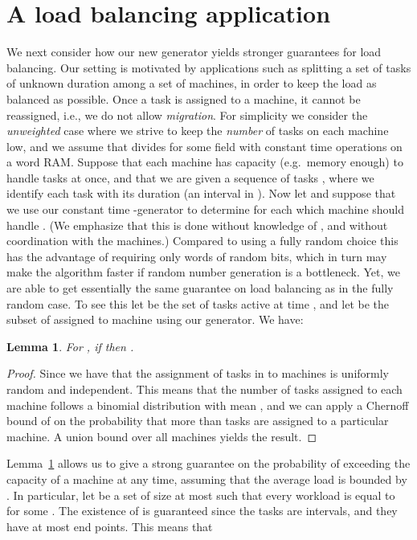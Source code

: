 \documentclass[a4paper,11pt]{article}
\theoremstyle{plain}
\newtheorem{lemma}{Lemma}
\theoremstyle{definition}
\begin{document}
\section{A load balancing application} \label{sec:loadbalancing}
We next consider how our new generator yields stronger guarantees for load balancing.
Our setting is motivated by applications such as splitting a set of tasks of unknown duration among a set of  machines, in order to keep the load as balanced as possible.
Once a task is assigned to a machine, it cannot be reassigned, i.e., we do not allow \emph{migration}.
For simplicity we consider the \emph{unweighted} case where we strive to keep the \emph{number} of tasks on each machine low, and we assume that  divides  for some field  with constant time operations on a word RAM.
Suppose that each machine has capacity (e.g.~memory enough) to handle  tasks at once, and that we are given a sequence of  tasks , where we identify each task with its duration (an interval in ).
Now let  and suppose that we use our constant time -generator to determine for each  which machine should handle .
(We emphasize that this is done without knowledge of , and without coordination with the machines.)
Compared to using a fully random choice this has the advantage of requiring only  words of random bits, which in turn may make the algorithm faster if random number generation is a bottleneck.
Yet, we are able to get essentially the same guarantee on load balancing as in the fully random case.
To see this let  be the set of tasks active at time , and let  be the subset of  assigned to machine  using our generator.
We have:
\begin{lemma}\label{lem:error}
For , if  then
.
\end{lemma}
\begin{proof}
Since  we have that the assignment of tasks in  to machines is uniformly random and independent.
This means that the number of tasks assigned to each machine follows a binomial distribution with mean , and we can apply a Chernoff bound of  on the probability that more than  tasks are assigned to a particular machine.
A union bound over all  machines yields the result.
\end{proof}

Lemma~\ref{lem:error} allows us to give a strong guarantee on the probability of exceeding the capacity  of a machine at any time, assuming that the average load is bounded by .
In particular, let  be a set of size at most  such that every workload  is equal to  for some .
The existence of  is guaranteed since the  tasks are intervals, and they have at most  end points.
This means that
\end{document}
